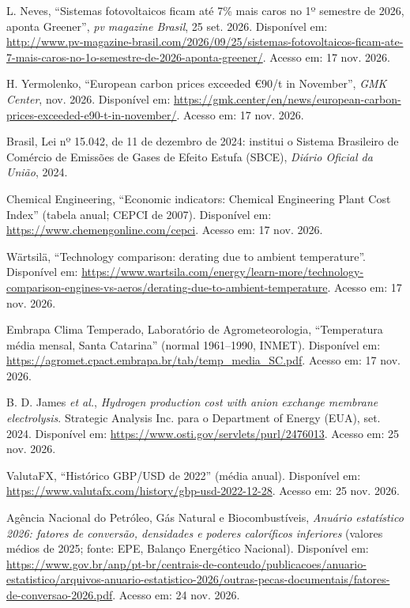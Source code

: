  L. Neves, ``Sistemas fotovoltaicos ficam até 7\% mais caros no 1º semestre de 2026, aponta Greener'', \textit{pv magazine Brasil}, 25 set. 2026. Disponível em: \url{http://www.pv-magazine-brasil.com/2026/09/25/sistemas-fotovoltaicos-ficam-ate-7-mais-caros-no-1o-semestre-de-2026-aponta-greener/}. Acesso em: 17 nov. 2026.

 H. Yermolenko, ``European carbon prices exceeded €90/t in November'', \textit{GMK Center}, nov. 2026. Disponível em: \url{https://gmk.center/en/news/european-carbon-prices-exceeded-e90-t-in-november/}. Acesso em: 17 nov. 2026.

 Brasil, Lei nº 15.042, de 11 de dezembro de 2024: institui o Sistema Brasileiro de Comércio de Emissões de Gases de Efeito Estufa (SBCE), \textit{Diário Oficial da União}, 2024.

 Chemical Engineering, ``Economic indicators: Chemical Engineering Plant Cost Index'' (tabela anual; CEPCI de 2007). Disponível em: \url{https://www.chemengonline.com/cepci}. Acesso em: 17 nov. 2026.

 Wärtsilä, ``Technology comparison: derating due to ambient temperature''. Disponível em: \url{https://www.wartsila.com/energy/learn-more/technology-comparison-engines-vs-aeros/derating-due-to-ambient-temperature}. Acesso em: 17 nov. 2026.

 Embrapa Clima Temperado, Laboratório de Agrometeorologia, ``Temperatura média mensal, Santa Catarina'' (normal 1961--1990, INMET). Disponível em: \url{https://agromet.cpact.embrapa.br/tab/temp_media_SC.pdf}. Acesso em: 17 nov. 2026.

 B. D. James \textit{et al.}, \textit{Hydrogen production cost with anion exchange membrane electrolysis}. Strategic Analysis Inc. para o Department of Energy (EUA), set. 2024. Disponível em: \url{https://www.osti.gov/servlets/purl/2476013}. Acesso em: 25 nov. 2026.

 ValutaFX, ``Histórico GBP/USD de 2022'' (média anual). Disponível em: \url{https://www.valutafx.com/history/gbp-usd-2022-12-28}. Acesso em: 25 nov. 2026.

 Agência Nacional do Petróleo, Gás Natural e Biocombustíveis, \textit{Anuário estatístico 2026: fatores de conversão, densidades e poderes caloríficos inferiores} (valores médios de 2025; fonte: EPE, Balanço Energético Nacional). Disponível em: \url{https://www.gov.br/anp/pt-br/centrais-de-conteudo/publicacoes/anuario-estatistico/arquivos-anuario-estatistico-2026/outras-pecas-documentais/fatores-de-conversao-2026.pdf}. Acesso em: 24 nov. 2026.

